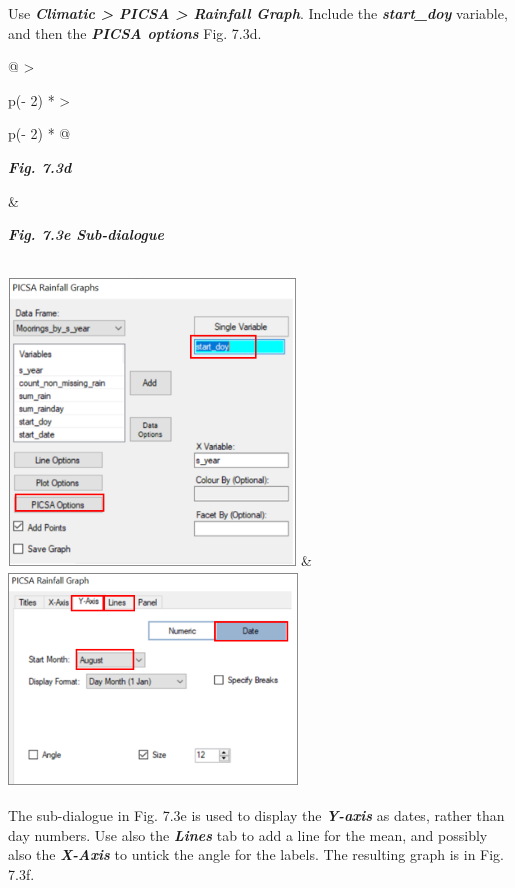 \documentclass[
  letterpaper,
  DIV=11,
  numbers=noendperiod]{scrreprt}
\begin{document}
Use \textbf{\emph{Climatic \textgreater{} PICSA \textgreater{} Rainfall
Graph}}. Include the \textbf{\emph{start\_doy}} variable, and then the
\textbf{\emph{PICSA options}} Fig. 7.3d.

\begin{longtable}[]{@{}
  >{\raggedright\arraybackslash}p{(\columnwidth - 2\tabcolsep) * }
  >{\raggedright\arraybackslash}p{(\columnwidth - 2\tabcolsep) * }@{}}
\toprule\noalign{}
\begin{minipage}[b]{\linewidth}\raggedright
\textbf{\emph{Fig. 7.3d}}
\end{minipage} & \begin{minipage}[b]{\linewidth}\raggedright
\textbf{\emph{Fig. 7.3e Sub-dialogue}}
\end{minipage} \\
\midrule\noalign{}
\endhead
\bottomrule\noalign{}
\endlastfoot
\includegraphics[width=3.00236in,height=2.99703in]{figures/Fig7.3d.png}
&
\includegraphics[width=3.01854in,height=2.26012in]{figures/Fig7.3e.png} \\
\end{longtable}

The sub-dialogue in Fig. 7.3e is used to display the
\textbf{\emph{Y-axis}} as dates, rather than day numbers. Use also the
\textbf{\emph{Lines}} tab to add a line for the mean, and possibly also
the \textbf{\emph{X-Axis}} to untick the angle for the labels. The
resulting graph is in Fig. 7.3f.
\end{document}
